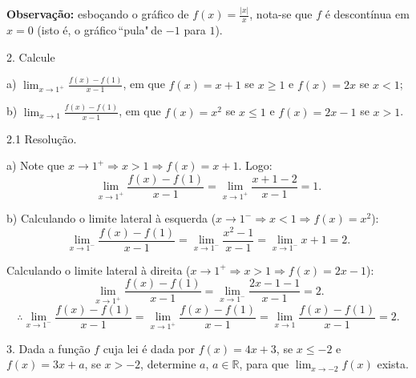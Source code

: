 \documentclass{article}
\begin{document}
{\begin{newpage}
\par
\vspace{0.3cm}
\textbf{Observação:} esboçando o gráfico de $\displaystyle{f(x)=\frac{|x|}{x}}$, nota-se que $f$ é descontínua em $x=0$ (isto é, o gráfico$\,$\textquotedblleft pula"$\,$de $-1$ para $1$).
\par
\vspace{0.3cm}
\begin{flushleft}
2. Calcule
\end{flushleft}
\par
a) $\displaystyle{\lim_{x\to 1^{+}}} \frac{f(x) - f(1)}{x-1}$, em que $f(x) = x+1$ se $x \geq 1$ e $f(x) = 2x$ se $x<1$;
\par
\vspace{0.3cm}
b) $\displaystyle{\lim_{x\to 1}} \frac{f(x) - f(1)}{x-1}$, em que $f(x) = x^2$ se $x \leq 1$ e $f(x) = 2x - 1$ se $x>1$.
\par
\vspace{0.3cm}
\begin{flushleft}
2.1 Resolução.
\end{flushleft}
\par
a) Note que $x\rightarrow 1^{+} \Rightarrow x>1 \Rightarrow f(x)=x+1$. Logo:
\begin{equation*} \displaystyle{\lim_{x\to 1^{+}}} \frac{f(x) - f(1)}{x-1} = \displaystyle{\lim_{x\to 1^{+}}} \frac{x+1-2}{x-1} = 1.\end{equation*}
\par
\vspace{0.3cm}
b) Calculando o limite lateral à esquerda ($x\rightarrow 1^{-} \Rightarrow x<1 \Rightarrow f(x) = x^2$):
\begin{equation*} \displaystyle{\lim_{x\to 1^{-}}} \frac{f(x) - f(1)}{x-1} = \displaystyle{\lim_{x\to 1^{-}}} \frac{x^{2} - 1}{x-1} = \displaystyle{\lim_{x\to 1^{-}}} x+1 = 2.\end{equation*}
\par Calculando o limite lateral à direita ($x\rightarrow 1^{+} \Rightarrow x>1 \Rightarrow f(x) = 2x-1$):
\begin{equation*} \displaystyle{\lim_{x\to 1^{+}}} \frac{f(x) - f(1)}{x-1} = \displaystyle{\lim_{x\to 1^{-}}} \frac{2x - 1 - 1}{x-1} = 2.\end{equation*}
$$\therefore  \displaystyle{\lim_{x\to 1^{-}}} \frac{f(x) - f(1)}{x-1} =   \displaystyle{\lim_{x\to 1^{+}}} \frac{f(x) - f(1)}{x-1} = \displaystyle{\lim_{x\to 1}} \frac{f(x) - f(1)}{x-1} = 2.$$
\begin{flushleft}
3. Dada a função $f$ cuja lei é dada por $f(x) = 4x+3$, se $x \leq -2$ e $f(x)=3x+a$, se $x>-2$, determine $a$, $a\in\mathbb{R}$, para que $\displaystyle{\lim_{x\to -2}} f(x)$ exista.

\end{flushleft}
\end{newpage}}
\end{document}
